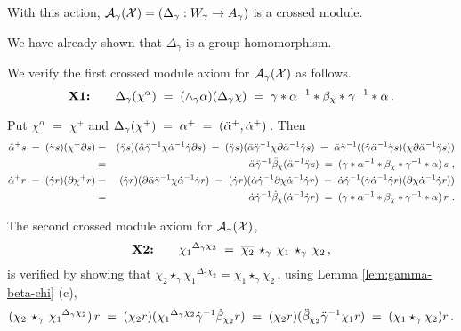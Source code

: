 \begin{thm}
With this action, 
$\mathcal{A}_{\gamma}(\mathcal{X}) = (\Delta_{\gamma} : W_{\gamma} \to A_{\gamma})$ 
is a crossed module.
\end{thm}
\begin{pf}
We have already shown that  $\Delta_{\gamma}$  is a group homomorphism.

\medskip\noindent
We verify the first crossed module axiom for  
$\mathcal{A}_{\gamma}(\mathcal{X})$  as follows. 
$$
\mbox{\textbf{X1:}} \quad\quad
\Delta_{\gamma}(\chi^{\alpha}) 
 \;=\;  (\wedge_{\gamma} \alpha)(\Delta_{\gamma}\chi) 
 \;=\;  \gamma*\alpha^{-1}*\beta_{\chi}*\gamma^{-1}*\alpha\,.
$$

\noindent
Put  $\chi^{\alpha} \;=\; \chi^+$
and  $\Delta_{\gamma}(\chi^+) \;=\; \alpha^+ \;=\; (\ddot{\alpha}^+,\dot{\alpha}^+)\,$.
Then
\begin{eqnarray*} 
\ddot{\alpha}^+ s \;=\; (\ddot{\gamma} s)(\chi^+ \partial s)
  & = & 
    (\ddot{\gamma} s)(\ddot{\alpha}\ddot{\gamma}^{-1}\chi\dot{\alpha}^{-1}\dot{\gamma}\partial s)
  \;=\;
    (\ddot{\gamma} s)(\ddot{\alpha}\ddot{\gamma}^{-1}\chi\partial\ddot{\alpha}^{-1}\ddot{\gamma} s)
  \;=\;
    \ddot{\alpha}\ddot{\gamma}^{-1}((\ddot{\gamma}\ddot{\alpha}^{-1}\ddot{\gamma} s)(\chi\partial\ddot{\alpha}^{-1}\ddot{\gamma} s)) \\
  & = &
    \ddot{\alpha}\ddot{\gamma}^{-1}\ddot{\beta}_{\chi}(\ddot{\alpha}^{-1}\ddot{\gamma} s)
  \;=\;
    (\gamma * \alpha^{-1} * \beta_{\chi} * \gamma^{-1} * \alpha) \, s ~, \\
\dot{\alpha}^+ r \;=\; (\dot{\gamma} r)(\partial \chi^+ r)
  & = &
    (\dot{\gamma} r)(\partial \ddot{\alpha} \ddot{\gamma}^{-1} \chi \dot{\alpha}^{-1} \dot{\gamma} r)
  \;=\;
    (\dot{\gamma} r)(\dot{\alpha} \dot{\gamma}^{-1} \partial \chi \dot{\alpha}^{-1} \dot{\gamma} r)
  \;=\;
    \dot{\alpha} \dot{\gamma}^{-1} (\dot{\gamma} \dot{\alpha}^{-1} \dot{\gamma} r) (\partial \chi \dot{\alpha}^{-1} \dot{\gamma} r) ) \\
  & = &
    \dot{\alpha} \dot{\gamma}^{-1} \dot{\beta}_{\chi}(\dot{\alpha}^{-1} \dot{\gamma} r)
  \;=\;
    (\gamma * \alpha^{-1} * \beta_{\chi} * \gamma^{-1} * \alpha) \, r ~. 
\end{eqnarray*}

\noindent
The second crossed module axiom for  $\mathcal{A}_{\gamma}(\mathcal{X})$, 
$$
\mbox{\textbf{X2:}} \quad\quad
{\chi_1}^{\Delta_{\gamma} \chi_2} \;=\;
  \overline{\chi_2} \,\star_{\gamma}\, \chi_1 \,\star_{\gamma}\, \chi_2\,,
$$
is verified by showing that 
$\chi_2 \star_{\gamma} {\chi_1}^{\Delta_{\gamma}\chi_2} 
 = \chi_1 \star_{\gamma} \chi_2$\,, 
using Lemma \ref{lem:gamma-beta-chi} (c), 
$$
(\chi_2 \,\star_{\gamma}\,{\chi_1}^{\Delta_{\gamma} \chi_2})\,r 
  \;=\; (\chi_2 r)({\chi_1}^{\Delta_{\gamma}\chi_2}\dot{\gamma}^{-1}\dot{\beta}_{\chi_2}r)
  \;=\; (\chi_2 r)(\ddot{\beta}_{\chi_2} \ddot{\gamma}^{-1} \chi_1 r)
  \;=\; (\chi_1 \star_{\gamma} \chi_2)r\,. 
$$ 
\end{pf}



